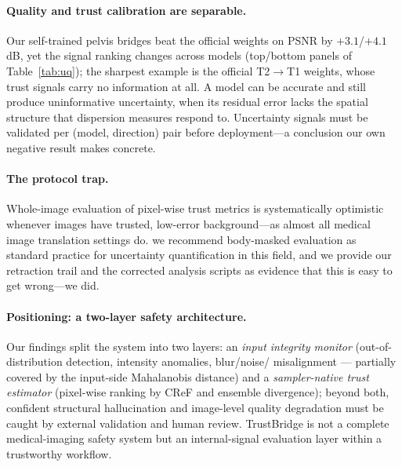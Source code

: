 \documentclass[11pt]{article}
\begin{document}
\paragraph{Quality and trust calibration are separable.}
Our self-trained pelvis bridges beat the official weights on PSNR by
$+3.1$/$+4.1$\,dB, yet the signal ranking changes across models (top/bottom
panels of Table~\ref{tab:uq}); the sharpest example is the official
T2$\to$T1 weights, whose trust signals carry no information at all. A model
can be accurate and still produce uninformative uncertainty, when its
residual error lacks the spatial structure that dispersion measures respond
to. Uncertainty signals must be validated per (model, direction) pair before
deployment---a conclusion our own negative result makes concrete.
\paragraph{The protocol trap.}
Whole-image evaluation of pixel-wise trust metrics is systematically
optimistic whenever images have trusted, low-error background---as almost all
medical image translation settings do. we recommend body-masked
evaluation as standard practice for uncertainty quantification in this field,
and we provide our retraction trail and the corrected analysis scripts as
evidence that this is easy to get wrong---we did.
\paragraph{Positioning: a two-layer safety architecture.}
Our findings split the system into two layers: an \emph{input integrity
monitor} (out-of-distribution detection, intensity anomalies, blur/noise/
misalignment --- partially covered by the input-side Mahalanobis distance) and
a \emph{sampler-native trust estimator} (pixel-wise ranking by CReF and
ensemble divergence); beyond both, confident structural hallucination and
image-level quality degradation must be caught by external validation and human
review. TrustBridge is not a complete medical-imaging safety system but an
internal-signal evaluation layer within a trustworthy workflow.
\end{document}
